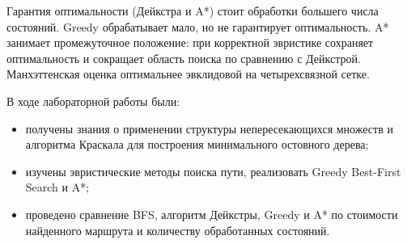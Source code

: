 Гарантия оптимальности (Дейкстра и A*) стоит обработки большего числа состояний. Greedy обрабатывает мало, но не гарантирует оптимальность. A* занимает промежуточное положение: при корректной эвристике сохраняет оптимальность и сокращает область поиска по сравнению с Дейкстрой. 
Манхэттенская оценка оптимальнее эвклидовой на четырехсвязной сетке.


В ходе лабораторной работы были:
\begin{itemize}
	\item получены знания о применении структуры непересекающихся множеств и алгоритма Краскала для построения минимального остовного дерева;
	\item изучены эвристические методы поиска пути, реализовать Greedy Best-First Search и A*;
	\item проведено сравнение BFS, алгоритм Дейкстры, Greedy и A* по стоимости найденного маршрута и количеству обработанных состояний.
\end{itemize}

